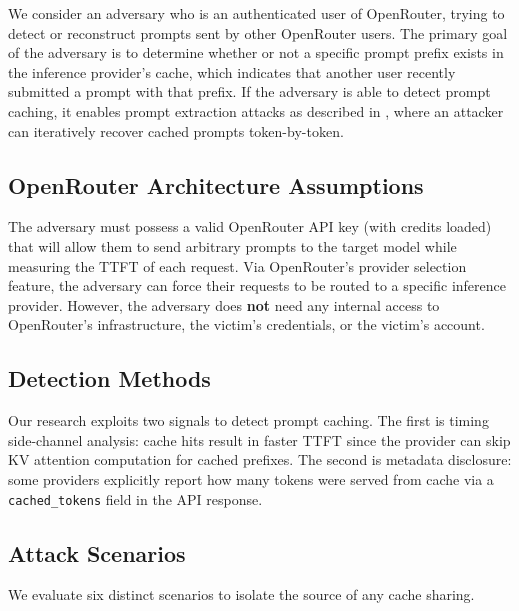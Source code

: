 \documentclass[conference]{IEEEtran}
\begin{document}
We consider an adversary who is an authenticated user of OpenRouter, trying to detect or reconstruct prompts sent by other OpenRouter users.
The primary goal of the adversary is to determine whether or not a specific prompt prefix exists in the inference provider's cache, which indicates that another user recently submitted a prompt with that prefix.
If the adversary is able to detect prompt caching, it enables prompt extraction attacks as described in \cite{DBLP:conf/icml/GuLKLH25}, where an attacker can iteratively recover cached prompts token-by-token.

\subsection{OpenRouter Architecture Assumptions}

The adversary must possess a valid OpenRouter API key (with credits loaded) that will allow them to send arbitrary prompts to the target model while measuring the TTFT of each request.
Via OpenRouter's provider selection feature, the adversary can force their requests to be routed to a specific inference provider.
However, the adversary does \textbf{not} need any internal access to OpenRouter's infrastructure, the victim's credentials, or the victim's account.

\subsection{Detection Methods}

Our research exploits two signals to detect prompt caching.
The first is timing side-channel analysis: cache hits result in faster TTFT since the provider can skip KV attention computation for cached prefixes.
The second is metadata disclosure: some providers explicitly report how many tokens were served from cache via a \texttt{cached\_tokens} field in the API response.

\subsection{Attack Scenarios}

We evaluate six distinct scenarios to isolate the source of any cache sharing.
\end{document}
